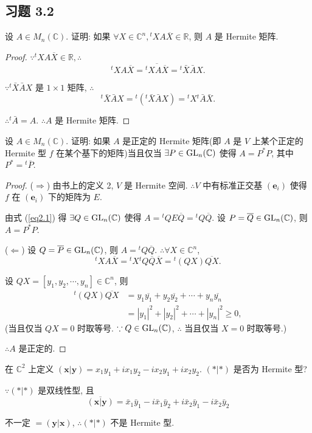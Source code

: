 \documentclass{ctexart}
\begin{document}
\subsection{习题 3.2}
\begin{exercisec}%
    设 $A\in M_n(\mathbb{C})$. 证明: 如果 $\forall X\in\mathbb{C}^n,{}^tXA\overline{X}\in\mathbb{R}$, 则 $A$ 是 Hermite 矩阵.
\end{exercisec}
\begin{proof}
    $\because{}^tXA\overline{X}\in\mathbb{R},\therefore$
    \[{}^tXA\overline{X}=\overline{{}^tXA\overline{X}}={}^t\bar{X}\bar{A}X.\]

    $\because{}^t\bar{X}\bar{A}X$ 是 $1\times1$ 矩阵, $\therefore$
    \[{}^t\bar{X}\bar{A}X={}^t({}^t\bar{X}\bar{A}X)={}^tX{}^t\bar{A}\bar{X}.\]

    $\therefore{}^t\bar{A}=A$. $\therefore A$ 是 Hermite 矩阵.
\end{proof}
\begin{exercisec}%
    设 $A\in M_n(\mathbb{C})$. 证明: 如果 $A$ 是正定的 Hermite 矩阵(即 $A$ 是 $V$ 上某个正定的 Hermite 型 $f$ 在某个基下的矩阵)当且仅当 $\exists P\in\operatorname{GL} _n(\mathbb{C})$ 使得 $A=P^*P$, 其中 $P^*={}^t\overline{P}$.
\end{exercisec}
\begin{proof}
    ($\Rightarrow$) 由书上的定义 2, $V$ 是 Hermite 空间. $\therefore V$ 中有标准正交基 $(\boldsymbol{e}_i)$ 使得 $f$ 在 $(\boldsymbol{e}_i)$ 下的矩阵为 $E$.

    由式 (\ref{eq2.1}) 得 $\exists Q\in\operatorname{GL} _n(\mathbb{C})$ 使得 $A={}^tQE\overline{Q}={}^tQ\overline{Q}$. 设 $P=\overline{Q}\in\operatorname{GL} _n(\mathbb{C})$, 则 $A=P^*P$.

    ($\Leftarrow$) 设 $Q=\overline{P}\in\operatorname{GL} _n(\mathbb{C})$, 则 $A={}^tQ\overline{Q}$. $\therefore\forall X\in\mathbb{C}^n$,
    \[{}^tXA\overline{X}={}^tX{}^tQ\overline{Q}\overline{X}={}^t(QX)\overline{QX}.\]

    设 $QX=[y_1,y_2,\cdots,y_n]\in\mathbb{C}^n$, 则
    \begin{align*}
        {}^t(QX)\overline{QX} & =y_1\overline{y_1}+y_2\overline{y_2}+\cdots+y_n\overline{y_n} \\
        & =|y_1|^2+|y_2|^2+\cdots+|y_n|^2\geq0,
    \end{align*}
    (当且仅当 $QX=0$ 时取等号. $\because Q\in\operatorname{GL} _n(\mathbb{C})$, $\therefore$ 当且仅当 $X=0$ 时取等号.)

    $\therefore A$ 是正定的.
\end{proof}
\begin{exercisec}%
    在 $\mathbb{C}^2$ 上定义 $(\boldsymbol{x}|\boldsymbol{y})=x_1y_1+ix_1y_2-ix_2y_1+ix_2y_2$. $(*|*)$ 是否为 Hermite 型?
\end{exercisec}
\begin{solution}
    $\because(*|*)$ 是双线性型, 且
    \[\overline{(\boldsymbol{x}|\boldsymbol{y})}=\bar{x}_1\bar{y}_1-i\bar{x}_1\bar{y}_2+i\bar{x}_2\bar{y}_1-i\bar{x}_2\bar{y}_2\]

    不一定 $=(\boldsymbol{y}|\boldsymbol{x})$, $\therefore(*|*)$ 不是 Hermite 型.
\end{solution}
\end{document}
